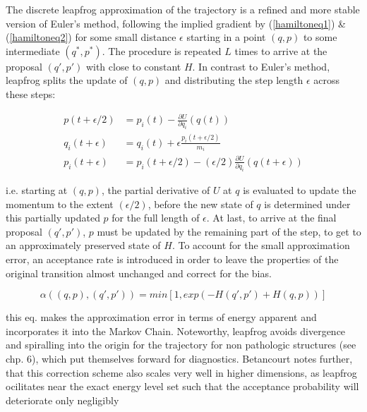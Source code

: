 \documentclass[11pt]{article}
\begin{document}

        The discrete leapfrog approximation of the trajectory is a refined and more stable version of Euler's method, following the implied gradient by (\ref{hamiltoneq1}) \& (\ref{hamiltoneq2}) for some small distance $\epsilon$ starting in a point $(q,p)$ to some intermediate $(q^*, p^*)$. The procedure is repeated $L$ times to arrive at the proposal  $(q', p')$ with close to constant $H$. In contrast to Euler's method, leapfrog splits the update of $(q,p)$ and distributing the step length $\epsilon$ across these steps:

        \begin{align} \label{leapfrog}
            p(t + \epsilon/2) &= p_i(t) -\frac{\partial U}{\partial q_i} (q(t)) \\
           q_i(t+\epsilon) &= q_i(t) + \epsilon\frac{p_i(t+ \epsilon/2)}{m_i} \label{leapQupdate} \\
           p_i(t+\epsilon) &= p_i(t+ \epsilon/2) - (\epsilon/2) \frac{\partial U}{\partial q_i} (q(t +\epsilon))
        \end{align}

        i.e. starting at $(q,p)$, the partial derivative of $U$ at $q$ is evaluated to update the momentum to the extent $(\epsilon/2)$, before the new state of $q$ is determined under this partially updated $p$ for the full length of $\epsilon$. At last, to arrive at the final proposal $(q', p')$, $p$ must be updated by the remaining part of the step, to get to an approximately preserved state of $H$.
        To account for the small approximation error, an acceptance rate is introduced in order to leave the properties of the original transition almost unchanged and correct for the bias.

        \begin{equation} \label{hmcaccept}
            \alpha((q,p),(q', p')) = min\left[1, exp(-H(q',p') + H(q,p))\right]
        \end{equation}

        this eq. makes the approximation error in terms of energy apparent and incorporates it into the Markov Chain.
        Noteworthy, leapfrog avoids divergence  and spiralling into the origin for the trajectory for non pathologic structures (see \citep{betancourt2017conceptual} chp. 6), which put themselves forward for diagnostics. Betancourt notes further, that this correction scheme also scales very well in higher dimensions, as leapfrog ocilitates near the exact energy level set such that the acceptance probability will deteriorate only negligibly %
\end{document}
